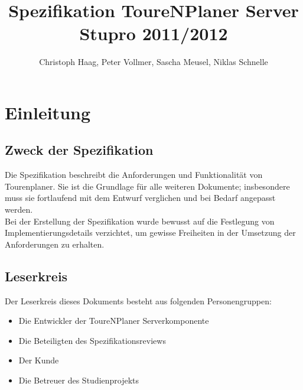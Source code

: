 \documentclass[a4paper,10pt,titlepage]{article}
\author{Christoph Haag, Peter Vollmer, Sascha Meusel, Niklas Schnelle}
\title{Spezifikation ToureNPlaner Server\\ Stupro 2011/2012}
\begin{document}
\maketitle
{}
\setcounter{page}{1}
\tableofcontents
\clearpage
{}
\setcounter{page}{1}

\section{Einleitung}
\subsection{Zweck der Spezifikation}
Die Spezifikation beschreibt die Anforderungen und Funktionalität von Tourenplaner. Sie ist die Grundlage für alle weiteren Dokumente; insbesondere muss sie fortlaufend mit dem Entwurf verglichen und bei Bedarf angepasst werden.\\
Bei der Erstellung der Spezifikation wurde bewusst auf die Festlegung von Implementierungsdetails verzichtet, um gewisse Freiheiten in der Umsetzung der Anforderungen zu erhalten.

\subsection{Leserkreis}
Der Leserkreis dieses Dokuments besteht aus folgenden Personengruppen:
\begin{itemize}
\item Die Entwickler der ToureNPlaner Serverkomponente
\item Die Beteiligten des Spezifikationsreviews
\item Der Kunde
\item Die Betreuer des Studienprojekts
\end{itemize}
\end{document}
